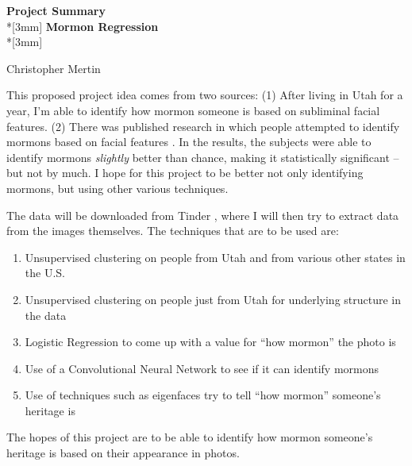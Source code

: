 \documentclass{article}
\begin{document}
\pagestyle{empty}
\begin{center}
{\Large{\bf Project Summary}}\\*[3mm]
{\bf Mormon Regression} \\*[3mm]

Christopher Mertin
\end{center}


This proposed project idea comes from two sources: (1) After living in Utah for a year, I'm able to identify how mormon someone is based on subliminal facial features. (2) There was published research in which people attempted to identify mormons based on facial features \cite{mormonID}. In the results, the subjects were able to identify mormons {\em slightly} better than chance, making it statistically significant -- but not by much. I hope for this project to be better not only identifying mormons, but using other various techniques. 

The data will be downloaded from Tinder \cite{pynder}, where I will then try to extract data from the images themselves. The techniques that are to be used are:

\begin{enumerate}
\item Unsupervised clustering on people from Utah and from various other states in the U.S. 
\item Unsupervised clustering on people just from Utah for underlying structure in the data
\item Logistic Regression to come up with a value for ``how mormon'' the photo is
\item Use of a Convolutional Neural Network to see if it can identify mormons
\item Use of techniques such as eigenfaces try to tell ``how mormon'' someone's heritage is
\end{enumerate}

The hopes of this project are to be able to identify how mormon someone's heritage is based on their appearance in photos. 



\end{document}
